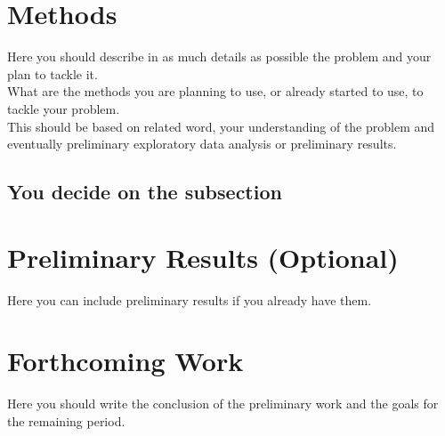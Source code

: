 \documentclass[sigplan]{acmart}
\begin{document}
\section{Methods} \label{sec:methods}

Here you should describe in as much details as possible the problem and your plan to tackle it. \\

What are the methods you are planning to use, or already started to use, to tackle your problem. \\

This should be based on related word, your understanding of the problem and eventually preliminary exploratory data analysis or preliminary results.

\subsection{You decide on the subsection} 

\section{Preliminary Results (Optional)} \label{sec:preliminaryresults}

Here you can include preliminary results if you already have them.


\section{Forthcoming Work} \label{sec:forthcomingwork}

Here you should write the conclusion of the preliminary work and the goals for the remaining period.




\end{document}
